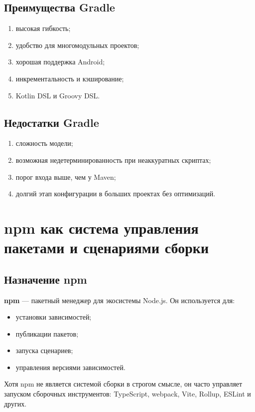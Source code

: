 \documentclass[12pt,a4paper]{article}
\begin{document}
\subsection{Преимущества Gradle}

\begin{enumerate}
    \item высокая гибкость;
    \item удобство для многомодульных проектов;
    \item хорошая поддержка Android;
    \item инкрементальность и кэширование;
    \item Kotlin DSL и Groovy DSL.
\end{enumerate}

\subsection{Недостатки Gradle}

\begin{enumerate}
    \item сложность модели;
    \item возможная недетерминированность при неаккуратных скриптах;
    \item порог входа выше, чем у Maven;
    \item долгий этап конфигурации в больших проектах без оптимизаций.
\end{enumerate}

\section{npm как система управления пакетами и сценариями сборки}

\subsection{Назначение npm}

\textbf{npm} --- пакетный менеджер для экосистемы Node.js. Он используется для:
\begin{itemize}
    \item установки зависимостей;
    \item публикации пакетов;
    \item запуска сценариев;
    \item управления версиями зависимостей.
\end{itemize}

Хотя npm не является системой сборки в строгом смысле, он часто управляет запуском сборочных инструментов: TypeScript, webpack, Vite, Rollup, ESLint и других.
\end{document}
